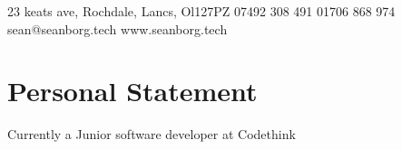 \documentclass{my_cv}
\begin{document}
\contactInfo
{23 keats ave, Rochdale, Lancs, Ol127PZ}
{07492 308 491}
{01706 868 974}
{sean@seanborg.tech}
{www.seanborg.tech}

\section{Personal Statement}
Currently a Junior software developer at Codethink

%
%
%
%
%
%
%
%
%
%
%
%
%
\end{document}
